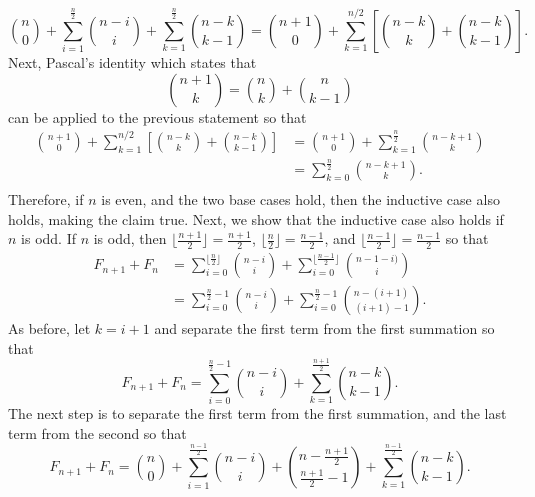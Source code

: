 \documentclass{article}
\begin{document}
\begin{equation*}
{n \choose 0} + \sum_{i=1}^{\frac{n}{2}} {n-i \choose i} + \sum_{k=1}^{\frac{n}{2}} {n-k \choose k-1} = {n+1 \choose 0} + \sum_{k=1}^{n/2} \left [ {n-k \choose k} + {n-k \choose k-1}\right ].
\end{equation*} 
Next, Pascal's identity which states that 
\begin{equation*}
{n + 1 \choose k} = {n \choose k} + {n \choose k - 1}
\end{equation*}
can be applied to the previous statement so that
\begin{equation*}\begin{aligned}
{n+1 \choose 0} + \sum_{k=1}^{n/2} \left [ {n-k \choose k} + {n-k \choose k-1}\right ] &= {n+1 \choose 0} + \sum_{k=1}^{\frac{n}{2}} {n - k + 1 \choose k} \\
																					   &= \sum_{k=0}^{\frac{n}{2}} {n - k + 1 \choose k}. \\
\end{aligned}\end{equation*}
Therefore, if $n$ is even, and the two base cases hold, then the inductive case also holds, making the claim true. Next, we show that the inductive case also holds if $n$ is odd. If $n$ is odd, then $\lfloor \frac{n+1}{2} \rfloor = \frac{n+1}{2}$, $\lfloor \frac{n}{2} \rfloor = \frac{n-1}{2}$, and $\lfloor \frac{n-1}{2} \rfloor = \frac{n-1}{2}$ so that
\begin{equation*}\begin{aligned}
	F_{n + 1} + F_n & = \sum_{i=0}^{\lfloor \frac{n}{2}\rfloor} {n-i \choose i} + \sum_{i=0}^{\lfloor \frac{n-1}{2}\rfloor} {n-1 - i) \choose i} \\
                    & = \sum_{i=0}^{\frac{n}{2} - 1} {n-i\choose i} + \sum_{i=0}^{\frac{n}{2}-1} {n-(i+1) \choose (i+1) - 1}.
\end{aligned}\end{equation*}
As before, let $k = i+1$ and separate the first term from the first summation so that
\begin{equation*}
F_{n+1} + F_n = \sum_{i=0}^{\frac{n}{2} - 1} {n-i\choose i} + \sum_{k=1}^{\frac{n+1}{2}} {n-k \choose k - 1}.
\end{equation*}
The next step is to separate the first term from the first summation, and the last term from the second so that
\begin{equation*}
F_{n+1} + F_n = {n \choose 0} + \sum_{i=1}^{\frac{n - 1}{2}} {n-i\choose i} + {n - \frac{n+1}{2} \choose \frac{n+1}{2} - 1} + \sum_{k=1}^{\frac{n-1}{2}} {n-k \choose k - 1}.
\end{equation*}
\end{document}
